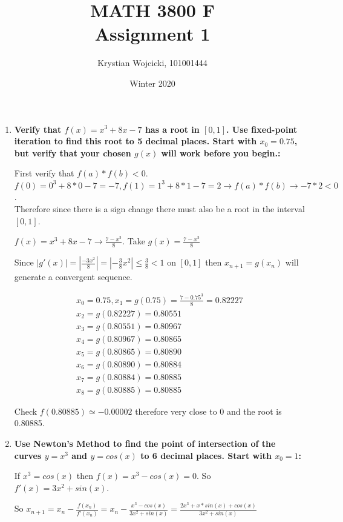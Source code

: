 \documentclass{article}
\title{MATH 3800 F\\
	\large{Assignment 1}}
\author{Krystian Wojcicki, 101001444}
\date{Winter 2020}
\begin{document}
\maketitle

\begin{enumerate}[1.]
\item

\textbf{Verify that $f(x) = x^3 +8x - 7$ has a root in $[0,1]$.  Use fixed-point iteration to find this
root to 5 decimal places. Start with $x_0 = 0.75$, but verify that your chosen $g(x)$ will work
before you begin.:}

First verify that $f(a) * f(b) < 0$. \\
$f(0) = 0^3 + 8 * 0 - 7 = -7, f(1) = 1^3 + 8 * 1- 7 = 2 \to f(a) * f(b) \to -7 * 2 < 0$. \\
Therefore since there is a sign change there must also be a root in the interval $[0,1]$.

$f(x) = x^3 + 8x - 7 \to \frac{7 - x^3}{8}$. Take $g(x) = \frac{7 - x^3}{8}$

Since $|g\prime(x)| = |\frac{-3x^2}{8}| = |-\frac{3}{8}x^2|  \leq \frac{3}{8} < 1$ on $[0,1]$ then $x_{n+1} = g(x_n)$ will generate a convergent sequence.

\begin{gather*}
x_0 = 0.75, x_1 = g(0.75) = \frac{7 - 0.75^3}{8} = 0.82227 \\
x_2 = g(0.82227) = 0.80551 \\
x_3 = g(0.80551) = 0.80967 \\
x_4 = g(0.80967) = 0.80865 \\ 
x_5 = g(0.80865) = 0.80890 \\
x_6 = g(0.80890) = 0.80884 \\
x_7 = g(0.80884) = 0.80885 \\
x_8 = g(0.80885) = 0.80885
\end{gather*}

Check $f(0.80885) \simeq -0.00002$ therefore very close to 0 and the root is 0.80885.

\item
\textbf{Use Newton’s Method to find the point of intersection of the curves $y = x^3$ and $y = cos(x)$ to 6 decimal places. Start with $x_0 = 1$:}

If $x^3 = cos(x)$ then $f(x) = x^3 - cos(x) = 0$. So $f\prime(x) = 3x^2 + sin(x)$.

So $x_{n+1} = x_n - \frac{f(x_n)}{f\prime(x_n)} = x_n - \frac{x^3 - cos(x)}{3x^2 + sin(x)} = \frac{2x^3 + x * sin(x) + cos(x)}{3x^2 + sin(x)}$


\end{enumerate}
\end{document}
